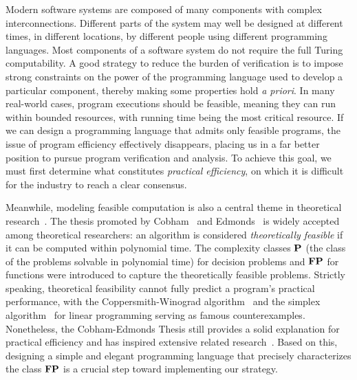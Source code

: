 \documentclass[runningheads]{llncs}
\begin{document}
Modern software systems are composed of many components with complex interconnections.
Different parts of the system may well be designed at different times, in different locations, by different people using different programming languages.
Most components of a software system do not require the full Turing computability.
A good strategy to reduce the burden of verification is to impose strong constraints on the power of the programming language used to develop a particular component, thereby making some properties hold \emph{a priori}.
In many real-world cases, program executions should be feasible, meaning they can run within bounded resources, with running time being the most critical resource.
If we can design a programming language that admits only feasible programs, the issue of program efficiency effectively disappears, placing us in a far better position to pursue program verification and analysis.
To achieve this goal, we must first determine what constitutes \emph{practical efficiency}, on which it is difficult for the industry to reach a clear consensus.

Meanwhile, modeling feasible computation is also a central theme in theoretical research~\cite{hartmanis1965computational}.
The thesis promoted by Cobham~\cite{cobham1965intrinsic} and Edmonds~\cite{edmonds1965paths} is widely accepted among theoretical researchers: an algorithm is considered \emph{theoretically feasible} if it can be computed within polynomial time.
The complexity classes $\mathbf{P}$ (the class of the problems solvable in polynomial time) for decision problems and $\mathbf{FP}$ for functions were introduced to capture the theoretically feasible problems.
Strictly speaking, theoretical feasibility cannot fully predict a program’s practical performance, with the Coppersmith-Winograd algorithm~\cite{COPPERSMITH1990251} and the simplex algorithm~\cite{Klee1970HOWGI} for linear programming serving as famous counterexamples.
Nonetheless, the Cobham-Edmonds Thesis still provides a solid explanation for practical efficiency and has inspired extensive related research~\cite{cook2023feasibly,cook1989functional}.
Based on this, designing a simple and elegant programming language that precisely characterizes the class $\mathbf{FP}$ is a crucial step toward implementing our strategy.
\end{document}
